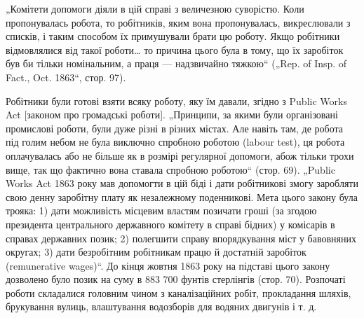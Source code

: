 „Комітети допомоги діяли в цій справі з величезною суворістю.
Коли пропонувалась робота, то робітників, яким вона пропонувалась,
викреслювали з списків, і таким способом їх примушували
брати цю роботу. Якщо робітники відмовлялися від такої роботи\dots{}
то причина цього була в тому, що їх заробіток був би тільки
номінальним, а праця — надзвичайно тяжкою“ („Rep. of Insp. of
Fact., Oct. 1863“, стор. 97).

Робітники були готові взяти всяку роботу, яку їм давали,
згідно з Public Works Act [законом про громадські роботи].
„Принципи, за якими були організовані промислові роботи, були
дуже різні в різних містах. Але навіть там, де робота під голим
небом не була виключно спробною роботою (labour test), ця
робота оплачувалась або не більше як в розмірі регулярної
допомоги, абож тільки трохи вище, так що фактично вона ставала
спробною роботою“ (стор. 69). „Public Works Act 1863 року
мав допомогти в цій біді і дати робітникові змогу заробляти свою
денну заробітну плату як незалежному поденникові. Мета цього
закону була трояка: 1) дати можливість місцевим властям позичати
гроші (за згодою президента центрального державного
комітету в справі бідних) у комісарів в справах державних позик;
2) полегшити справу впорядкування міст у бавовняних округах;
3) дати безробітним робітникам працю й достатній заробіток
(remunerative wages)“. До кінця жовтня 1863 року на підставі
цього закону дозволено було позик на суму в 883 700 фунтів
стерлінгів (стор. 70). Розпочаті роботи складалися головним
чином з каналізаційних робіт, прокладання шляхів, брукування
вулиць, влаштування водозборів для водяних двигунів і т. д.

